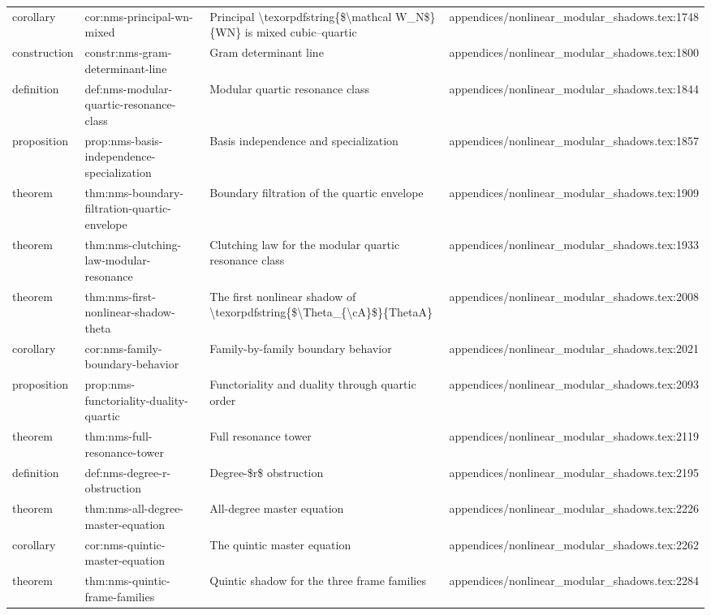 \documentclass[11pt]{article}
\begin{document}
\begin{longtable}{L{0.10\textwidth}L{0.26\textwidth}L{0.42\textwidth}L{0.22\textwidth}}
corollary & cor:nms-principal-wn-mixed & Principal \textbackslash{}texorpdfstring\{\$\textbackslash{}mathcal W\_N\$\}\{WN\} is mixed cubic--quartic & appendices/nonlinear\_modular\_shadows.tex:1748\\
construction & constr:nms-gram-determinant-line & Gram determinant line & appendices/nonlinear\_modular\_shadows.tex:1800\\
definition & def:nms-modular-quartic-resonance-class & Modular quartic resonance class & appendices/nonlinear\_modular\_shadows.tex:1844\\
proposition & prop:nms-basis-independence-specialization & Basis independence and specialization & appendices/nonlinear\_modular\_shadows.tex:1857\\
theorem & thm:nms-boundary-filtration-quartic-envelope & Boundary filtration of the quartic envelope & appendices/nonlinear\_modular\_shadows.tex:1909\\
theorem & thm:nms-clutching-law-modular-resonance & Clutching law for the modular quartic resonance class & appendices/nonlinear\_modular\_shadows.tex:1933\\
theorem & thm:nms-first-nonlinear-shadow-theta & The first nonlinear shadow of \textbackslash{}texorpdfstring\{\$\textbackslash{}Theta\_\{\textbackslash{}cA\}\$\}\{ThetaA\} & appendices/nonlinear\_modular\_shadows.tex:2008\\
corollary & cor:nms-family-boundary-behavior & Family-by-family boundary behavior & appendices/nonlinear\_modular\_shadows.tex:2021\\
proposition & prop:nms-functoriality-duality-quartic & Functoriality and duality through quartic order & appendices/nonlinear\_modular\_shadows.tex:2093\\
theorem & thm:nms-full-resonance-tower & Full resonance tower & appendices/nonlinear\_modular\_shadows.tex:2119\\
definition & def:nms-degree-r-obstruction & Degree-\$r\$ obstruction & appendices/nonlinear\_modular\_shadows.tex:2195\\
theorem & thm:nms-all-degree-master-equation & All-degree master equation & appendices/nonlinear\_modular\_shadows.tex:2226\\
corollary & cor:nms-quintic-master-equation & The quintic master equation & appendices/nonlinear\_modular\_shadows.tex:2262\\
theorem & thm:nms-quintic-frame-families & Quintic shadow for the three frame families & appendices/nonlinear\_modular\_shadows.tex:2284\\

\end{longtable}
\end{document}
